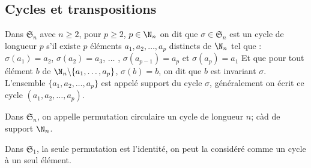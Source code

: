 \subsection{Cycles et transpositions}
\begin{defini}[Cycle]
Dans $\mathfrak{S}_n$ avec $n\geq 2$, pour $p\geq 2$, $p\in\N_n$ on dit que $\sigma\in\mathfrak{S}_n$ est un cycle de longueur $p$ s'il existe $p$ éléments $a_1,a_2,\dots,a_p$ distincts de $\N_n$ tel que :
$\sigma(a_1)=a_2$, $\sigma(a_2)=a_3$, $\dots$ , $\sigma(a_{p-1})=a_p$ et $\sigma(a_p)=a_1$
Et que pour tout élément $b$ de $\N_n\backslash\{a_1,\dots,a_p\}$, $\sigma(b)=b$, on dit que $b$ est invariant $\sigma$.
L'ensemble $\{a_1,a_2,\dots,a_p\}$ est appelé support du cycle $\sigma$, généralement on écrit ce cycle $(a_1,a_2,\dots,a_p)$.

Dans $\mathfrak{S}_n$, on appelle permutation circulaire un cycle de longueur $n$; càd de support $\N_n$.

Dans $\mathfrak{S}_1$, la seule permutation est l'identité, on peut la considéré comme un cycle à un seul élément.
\end{defini}

